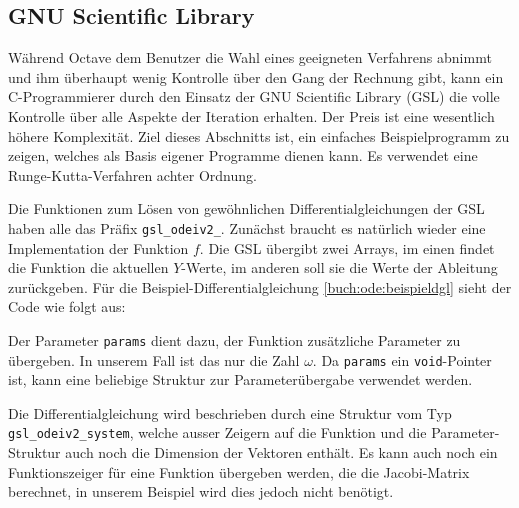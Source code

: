 \subsection{GNU Scientific Library}
%
%
Während Octave dem Benutzer die Wahl eines geeigneten Verfahrens abnimmt
und ihm überhaupt wenig Kontrolle über den Gang der Rechnung gibt,
kann ein C-Programmierer durch den Einsatz der GNU Scientific Library (GSL) die
%
volle Kontrolle über alle Aspekte der Iteration erhalten.
Der Preis ist eine wesentlich höhere Komplexität.
Ziel dieses Abschnitts ist, ein einfaches Beispielprogramm zu
zeigen, welches als Basis eigener Programme dienen kann.
Es verwendet eine Runge-Kutta-Verfahren achter Ordnung.

Die Funktionen zum Lösen von gewöhnlichen Differentialgleichungen
der GSL haben alle das Präfix \texttt{gsl\_odeiv2\_}. 
Zunächst braucht es natürlich wieder eine Implementation der
Funktion $f$. 
Die GSL übergibt zwei Arrays, im einen findet die Funktion die aktuellen
$Y$-Werte, im anderen soll sie die Werte der Ableitung zurückgeben.
Für die Beispiel-Differentialgleichung \eqref{buch:ode:beispieldgl}
sieht der Code wie folgt aus:

Der Parameter \texttt{params} dient dazu, der Funktion zusätzliche
Parameter zu übergeben.
In unserem Fall ist das nur die Zahl $\omega$.
Da \texttt{params} ein \texttt{void}-Pointer ist, kann eine beliebige
Struktur zur Parameterübergabe verwendet werden.

Die Differentialgleichung wird beschrieben durch eine Struktur vom Typ
\texttt{gsl\_odeiv2\_system}, welche ausser Zeigern auf die Funktion
und die Parameter-Struktur auch noch die Dimension der Vektoren enthält.
Es kann auch noch ein Funktionszeiger für eine Funktion übergeben
werden, die die Jacobi-Matrix berechnet, in unserem Beispiel wird dies
jedoch nicht benötigt.

